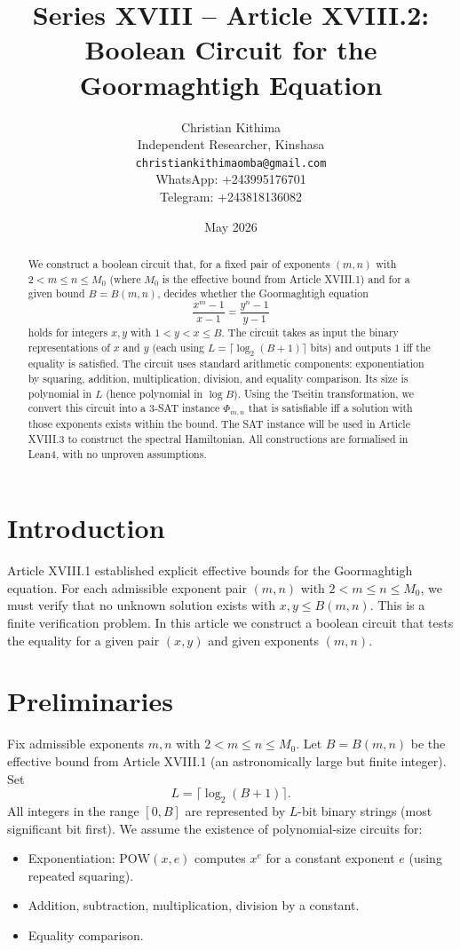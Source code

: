 \documentclass[11pt,a4paper]{article}
\title{Series XVIII – Article XVIII.2: Boolean Circuit for the Goormaghtigh Equation}
\author{Christian Kithima \\
Independent Researcher, Kinshasa \\
\texttt{christiankithimaomba@gmail.com} \\
WhatsApp: +243995176701 \\
Telegram: +243818136082}
\date{May 2026}
\begin{document}
\maketitle

\begin{abstract}
We construct a boolean circuit that, for a fixed pair of exponents \((m,n)\) with \(2<m\le n\le M_0\) (where \(M_0\) is the effective bound from Article XVIII.1) and for a given bound \(B = B(m,n)\), decides whether the Goormaghtigh equation
\[
\frac{x^{m}-1}{x-1} = \frac{y^{n}-1}{y-1}
\]
holds for integers \(x,y\) with \(1<y<x\le B\). The circuit takes as input the binary representations of \(x\) and \(y\) (each using \(L = \lceil \log_2(B+1)\rceil\) bits) and outputs \(1\) iff the equality is satisfied. The circuit uses standard arithmetic components: exponentiation by squaring, addition, multiplication, division, and equality comparison. Its size is polynomial in \(L\) (hence polynomial in \(\log B\)). Using the Tseitin transformation, we convert this circuit into a 3‑SAT instance \(\Phi_{m,n}\) that is satisfiable iff a solution with those exponents exists within the bound. The SAT instance will be used in Article XVIII.3 to construct the spectral Hamiltonian. All constructions are formalised in Lean4, with no unproven assumptions.
\end{abstract}

\tableofcontents

\section{Introduction}

Article XVIII.1 established explicit effective bounds for the Goormaghtigh equation. For each admissible exponent pair \((m,n)\) with \(2<m\le n\le M_0\), we must verify that no unknown solution exists with \(x,y \le B(m,n)\). This is a finite verification problem. In this article we construct a boolean circuit that tests the equality for a given pair \((x,y)\) and given exponents \((m,n)\).

\section{Preliminaries}

Fix admissible exponents \(m,n\) with \(2<m\le n\le M_0\). Let \(B = B(m,n)\) be the effective bound from Article XVIII.1 (an astronomically large but finite integer). Set
\[
L = \lceil \log_2(B+1)\rceil.
\]
All integers in the range \([0,B]\) are represented by \(L\)-bit binary strings (most significant bit first). We assume the existence of polynomial‑size circuits for:
\begin{itemize}
\item Exponentiation: \(\mathrm{POW}(x, e)\) computes \(x^e\) for a constant exponent \(e\) (using repeated squaring).
\item Addition, subtraction, multiplication, division by a constant.
\item Equality comparison.
\end{itemize}
\end{document}
